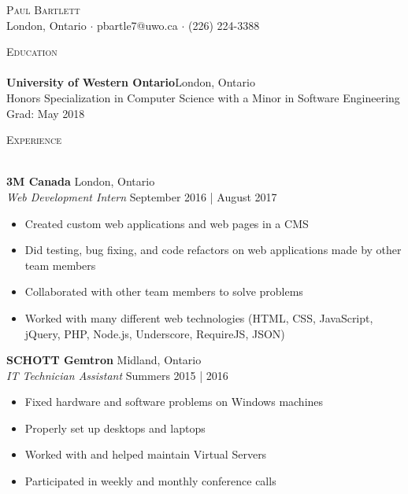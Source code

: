 \documentclass[a4paper]{article}
\newcommand{\lineunder} {
    \vspace*{-8pt} \\
    \hspace*{-18pt} \hrulefill \\
}
\newcommand{\header} [1] {
    {\hspace*{-18pt}\vspace*{6pt} \textsc{#1}}
    \vspace*{-6pt} \lineunder
}
\begin{document}
\vspace*{-40pt}

\vspace*{-10pt}
\begin{center}
	{\Huge \scshape {Paul Bartlett}}\\
	London, Ontario $\cdot$ pbartle7@uwo.ca $\cdot$ (226) 224-3388\\
\end{center}

\vspace*{2mm}

\header{Education}
\textbf{University of Western Ontario}\hfill London, Ontario\\
Honors Specialization in Computer Science with a Minor in Software Engineering \hfill Grad: May 2018\\
\vspace{2mm}

\vspace*{2mm}

\header{Experience}
\vspace{1mm}

\textbf{3M Canada} \hfill London, Ontario\\
\textit{Web Development Intern} \hfill September 2016 | August 2017\\
\vspace{-1mm}
\begin{itemize} \itemsep 1pt
	\item Created custom web applications and web pages in a CMS
	\item Did testing, bug fixing, and code refactors on web applications made by other team members
	\item Collaborated with other team members to solve problems
	\item Worked with many different web technologies (HTML, CSS, JavaScript, jQuery, PHP, Node.js, Underscore, RequireJS, JSON)
\end{itemize}

\textbf{SCHOTT Gemtron} \hfill Midland, Ontario\\
\textit{IT Technician Assistant} \hfill Summers 2015 | 2016\\
\vspace{-1mm}
\begin{itemize} \itemsep 1pt
	\item Fixed hardware and software problems on Windows machines
	\item Properly set up desktops and laptops
	\item Worked with and helped maintain Virtual Servers
	\item Participated in weekly and monthly conference calls
\end{itemize}
\end{document}
